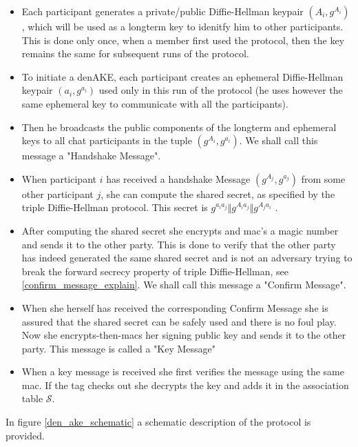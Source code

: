 \begin{itemize}

	\item[] Each participant generates a private/public Diffie-Hellman keypair $(A_i, g^{A_i})$, which will be used as a longterm key to idenitfy him to other participants. This
is done only once, when a member first used the protocol, then the key remains
the same for subsequent runs of the protocol.

	\item[] To initiate a denAKE, each participant creates an ephemeral Diffie-Hellman keypair
		$(a_i,g^{a_i})$ used only in this run of the protocol (he uses however the same ephemeral key
		to communicate with all the participants).

	\item[] Then he broadcasts the public components of the longterm and ephemeral keys to
		all chat participants in the tuple $(g^{A_i}, g^{a_i})$. We shall call this
		message a "Handshake Message".

	\item[] When participant $i$ has received a handshake Message $(g^{A_j}, g^{a_j})$ from some
		other participant $j$, she can compute the shared secret, as specified by the triple
		Diffie-Hellman protocol. This secret is $g^{a_ia_j} \Vert g^{A_ia_j} \Vert g^{A_ja_i}$
		.

	\item[] After computing the shared secret she encrypts and mac's a magic number and sends it
		to the other party. This is done to verify that the other party has indeed generated
		the same shared secret and is not an adversary trying to break the forward secrecy
		property of triple Diffie-Hellman, see \ref{confirm_message_explain}. We shall call
		this message a "Confirm Message".

	\item[] When she herself has received the corresponding Confirm Message she is assured that
		the shared secret can be safely used and there is no foul play. Now she
		encrypts-then-macs her signing public key and sends it to the other party. This
		message is called a "Key Message"


	\item[] When a key message is received she first verifies the message using the same mac.
		If the tag checks out she decrypts the key and adds it in the association table $\mathcal{S}$.
\end{itemize}

In figure \ref{den_ake_schematic} a schematic description of the protocol is provided.

